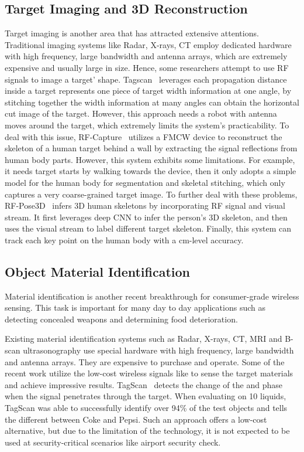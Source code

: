 \subsection{Target Imaging and 3D Reconstruction}

Target imaging is another area that has attracted extensive attentions. Traditional imaging systems like Radar, X-rays, CT employ dedicated
hardware with high frequency, large bandwidth and antenna arrays, which are extremely expensive and usually large in size. Hence, some
researchers attempt to use RF signals to image a target' shape. Tagscan~\cite{Tagscan} leverages each propagation distance inside a target
represents one piece of target width information at one angle, by stitching together the width information at many angles can obtain the
horizontal cut image of the target. However, this approach needs a robot with antenna moves around the target, which extremely limits the
system's practicability. To deal with this issue, RF-Capture~\cite{Adib2017Capturing} utilizes a FMCW device to reconstruct the skeleton of
a human target behind a wall by extracting the signal reflections from human body parts. However, this system exhibits some limitations.
For example, it needs target starts by walking towards the device, then it only adopts a simple model for the human body for segmentation
and skeletal stitching, which only captures a very coarse-grained target image. To further deal with these problems,
RF-Pose3D~\cite{zhao2018rf} infers 3D human skeletons by incorporating RF signal and visual stream. It first leverages deep CNN to infer
the person's 3D skeleton, and then uses the visual stream to label different target skeleton. Finally, this system can track each key point
on the human body with a cm-level accuracy.


\subsection{Object Material Identification}
Material identification is another recent breakthrough for consumer-grade wireless sensing. This task is important for many day to day
applications such as detecting concealed weapons and determining food deterioration.

Existing material identification systems such as Radar, X-rays, CT, MRI and B-scan ultrasonography use special hardware with high
frequency, large bandwidth and antenna arrays. They are expensive to purchase and operate. Some of the recent work utilize the low-cost
wireless signals like \RF to sense the target materials and achieve impressive results. TagScan~\cite{Tagscan} detects the change of the
\RSSI and phase when the \RF signal penetrates through the target. When evaluating on 10 liquids, TagScan was able to successfully identify
over 94\% of the test objects and tells the different between Coke and Pepsi. Such an approach offers a low-cost alternative, but due to
the limitation of the technology, it is not expected to be used at security-critical scenarios like airport security check.


